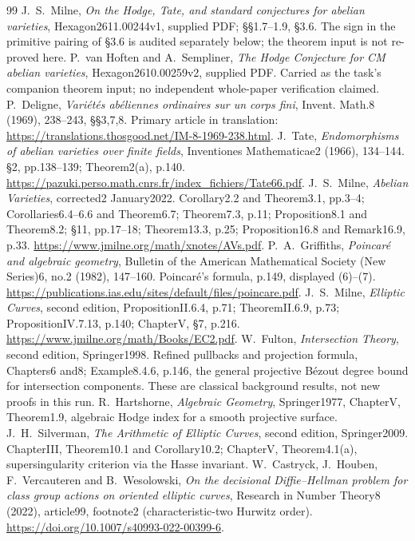 \begin{thebibliography}{99}
 J.~S.~Milne, \emph{On the Hodge, Tate, and standard conjectures for abelian varieties}, Hexagon2611.00244v1, supplied PDF; \S\S1.7--1.9, \S3.6. The sign in the primitive pairing of \S3.6 is audited separately below; the theorem input is not re-proved here.
 P.~van Hoften and A.~Sempliner, \emph{The Hodge Conjecture for CM abelian varieties}, Hexagon2610.00259v2, supplied PDF. Carried as the task's companion theorem input; no independent whole-paper verification claimed.
 P.~Deligne, \emph{Vari\'et\'es ab\'eliennes ordinaires sur un corps fini}, Invent. Math.8 (1969), 238--243, \S\S3,7,8. Primary article in translation: \url{https://translations.thosgood.net/IM-8-1969-238.html}.
 J.~Tate, \emph{Endomorphisms of abelian varieties over finite fields}, Inventiones Mathematicae2 (1966), 134--144. \S2, pp.138--139; Theorem2(a), p.140. \url{https://pazuki.perso.math.cnrs.fr/index_fichiers/Tate66.pdf}.
 J.~S.~Milne, \emph{Abelian Varieties}, corrected2 January2022. Corollary2.2 and Theorem3.1, pp.3--4; Corollaries6.4--6.6 and Theorem6.7; Theorem7.3, p.11; Proposition8.1 and Theorem8.2; \S11, pp.17--18; Theorem13.3, p.25; Proposition16.8 and Remark16.9, p.33. \url{https://www.jmilne.org/math/xnotes/AVs.pdf}.
 P.~A.~Griffiths, \emph{Poincar\'e and algebraic geometry}, Bulletin of the American Mathematical Society (New Series)6, no.2 (1982), 147--160. Poincar\'e's formula, p.149, displayed (6)--(7). \url{https://publications.ias.edu/sites/default/files/poincare.pdf}.
 J.~S.~Milne, \emph{Elliptic Curves}, second edition, PropositionII.6.4, p.71; TheoremII.6.9, p.73; PropositionIV.7.13, p.140; ChapterV, \S7, p.216. \url{https://www.jmilne.org/math/Books/EC2.pdf}.
 W.~Fulton, \emph{Intersection Theory}, second edition, Springer1998. Refined pullbacks and projection formula, Chapters6 and8; Example8.4.6, p.146, the general projective B\'ezout degree bound for intersection components. These are classical background results, not new proofs in this run.
 R.~Hartshorne, \emph{Algebraic Geometry}, Springer1977, ChapterV, Theorem1.9, algebraic Hodge index for a smooth projective surface.
 J.~H.~Silverman, \emph{The Arithmetic of Elliptic Curves}, second edition, Springer2009. ChapterIII, Theorem10.1 and Corollary10.2; ChapterV, Theorem4.1(a), supersingularity criterion via the Hasse invariant.
 W.~Castryck, J.~Houben, F.~Vercauteren and B.~Wesolowski, \emph{On the decisional Diffie--Hellman problem for class group actions on oriented elliptic curves}, Research in Number Theory8 (2022), article99, footnote2 (characteristic-two Hurwitz order). \url{https://doi.org/10.1007/s40993-022-00399-6}.

\end{thebibliography}
